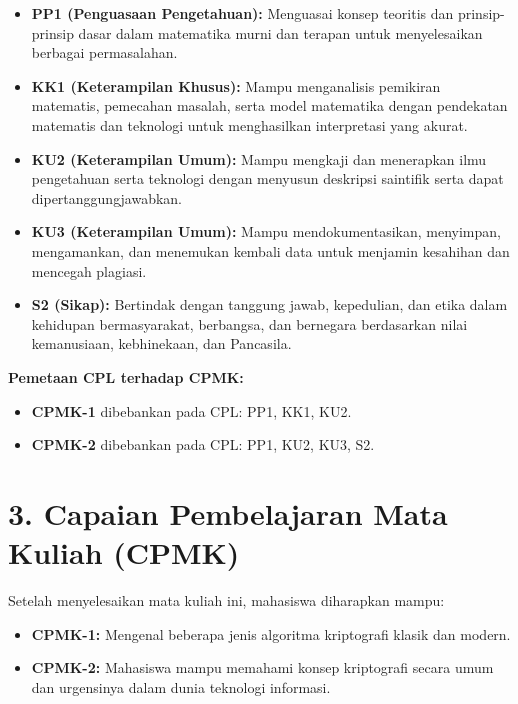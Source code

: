 \documentclass[12pt,a4paper]{article}
\begin{document}
\begin{itemize}[leftmargin=*]
  \item \textbf{PP1 (Penguasaan Pengetahuan):} Menguasai konsep teoritis dan prinsip-prinsip dasar dalam matematika murni dan terapan untuk menyelesaikan berbagai permasalahan.
  \item \textbf{KK1 (Keterampilan Khusus):} Mampu menganalisis pemikiran matematis, pemecahan masalah, serta model matematika dengan pendekatan matematis dan teknologi untuk menghasilkan interpretasi yang akurat.
  \item \textbf{KU2 (Keterampilan Umum):} Mampu mengkaji dan menerapkan ilmu pengetahuan serta teknologi dengan menyusun deskripsi saintifik serta dapat dipertanggungjawabkan.
  \item \textbf{KU3 (Keterampilan Umum):} Mampu mendokumentasikan, menyimpan, mengamankan, dan menemukan kembali data untuk menjamin kesahihan dan mencegah plagiasi.
  \item \textbf{S2 (Sikap):} Bertindak dengan tanggung jawab, kepedulian, dan etika dalam kehidupan bermasyarakat, berbangsa, dan bernegara berdasarkan nilai kemanusiaan, kebhinekaan, dan Pancasila.
\end{itemize}

\noindent\textbf{Pemetaan CPL terhadap CPMK:}
\begin{itemize}[leftmargin=*]
  \item \textbf{CPMK-1} dibebankan pada CPL: PP1, KK1, KU2.
  \item \textbf{CPMK-2} dibebankan pada CPL: PP1, KU2, KU3, S2.
\end{itemize}

\vspace{0.5cm}

\section*{3. Capaian Pembelajaran Mata Kuliah (CPMK)}

Setelah menyelesaikan mata kuliah ini, mahasiswa diharapkan mampu:

\begin{itemize}[leftmargin=*]
  \item \textbf{CPMK-1:} Mengenal beberapa jenis algoritma kriptografi klasik dan modern.
  \item \textbf{CPMK-2:} Mahasiswa mampu memahami konsep kriptografi secara umum dan urgensinya dalam dunia teknologi informasi.
\end{itemize}
\end{document}
